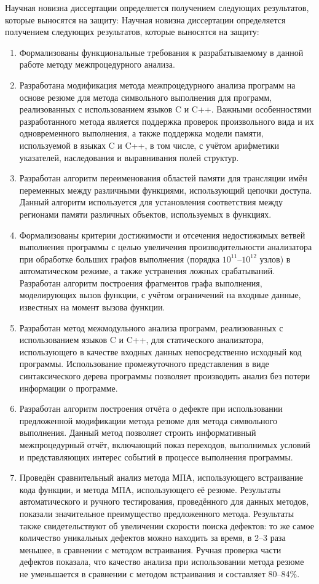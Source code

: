 Научная новизна диссертации определяется получением следующих результатов, которые выносятся на защиту:
Научная новизна диссертации определяется получением следующих результатов, которые выносятся на защиту:
\begin{enumerate}
  \item Формализованы функциональные требования к разрабатываемому в данной работе методу межпроцедурного анализа.
  \item Разработана модификация метода межпроцедурного анализа программ на основе резюме для метода символьного выполнения для программ, реализованных с использованием языков C и C++. Важными особенностями разработанного метода является поддержка проверок произвольного вида и их одновременного выполнения, а также поддержка модели памяти, используемой в языках C и C++, в том числе, с учётом арифметики указателей, наследования и выравнивания полей структур.
  \item Разработан алгоритм переименования областей памяти для трансляции имён переменных между различными функциями, использующий цепочки доступа. Данный алгоритм используется для установления соответствия между регионами памяти различных объектов, используемых в функциях.
  \item Формализованы критерии достижимости и отсечения недостижимых ветвей выполнения программы с целью увеличения производительности анализатора при обработке больших графов выполнения (порядка $10^{11}$--$10^{12}$ узлов) в автоматическом режиме, а также устранения ложных срабатываний. Разработан алгоритм построения фрагментов графа выполнения, моделирующих вызов функции, с учётом ограничений на входные данные, известных на момент вызова функции. 
  \item Разработан метод межмодульного анализа программ, реализованных с использованием языков C и C++, для статического анализатора, использующего в качестве входных данных непосредственно исходный код программы. Использование промежуточного представления в виде синтаксического дерева программы позволяет производить анализ без потери информации о программе.
  \item Разработан алгоритм построения отчёта о дефекте при использовании предложенной модификации метода резюме для метода символьного выполнения. Данный метод позволяет строить информативный межпроцедурный отчёт, включающий показ переходов, выполнимых условий и представляющих интерес событий в процессе выполнения программы.
  \item Проведён сравнительный анализ метода МПА, использующего встраивание кода функции, и метода МПА, использующего её резюме. Результаты автоматического и ручного тестирования, проведённого для данных методов, показали значительное преимущество предложенного метода. Результаты также свидетельствуют об увеличении скорости поиска дефектов: то же самое количество уникальных дефектов можно находить за время, в 2--3 раза меньшее, в сравнении с методом встраивания. Ручная проверка части дефектов показала, что качество анализа при использовании метода резюме не уменьшается в сравнении с методом встраивания и составляет 80--84\%.


\end{enumerate}

